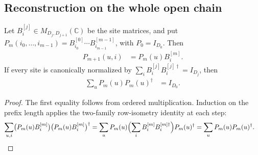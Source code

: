 \subsection{Reconstruction on the whole open chain}

\begin{lemma}
    \label{lem:varying_obc_prefix_product_row_isometry}
    \leanok
    Let $B^{[j]}_i\in M_{D_j,D_{j+1}}(\mathbb C)$ be the site matrices,
    and put $P_m(i_0,\ldots,i_{m-1})=B^{[0]}_{i_0}\cdots B^{[m-1]}_{i_{m-1}}$,
    with $P_0=I_{D_0}$. Then
    \begin{align}
        P_{m+1}(u,i) & =P_m(u)B^{[m]}_i.
    \end{align}
    If every site is canonically normalized by
    $\sum_iB^{[j]}_i B^{[j]\dagger}_i=I_{D_j}$, then
    \begin{align}
        \sum_{u}P_m(u)P_m(u)^\dagger & =I_{D_0}.
    \end{align}
\end{lemma}
\begin{proof}\leanok
    The first equality follows from ordered multiplication. Induction on the
    prefix length applies the two-family row-isometry identity at each step:
    \begin{align}
        \sum_{u,i}\bigl(P_m(u)B^{[m]}_i\bigr)\bigl(P_m(u)B^{[m]}_i\bigr)^\dagger
         & =\sum_uP_m(u)\Bigl(\sum_iB^{[m]}_iB^{[m]\dagger}_i\Bigr)P_m(u)^\dagger
        =\sum_uP_m(u)P_m(u)^\dagger.
        \label{eq:varying_obc_prefix_row_isometry_step}
    \end{align}
\end{proof}

